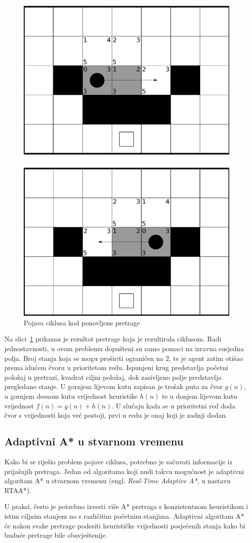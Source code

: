\documentclass[times, utf8, zavrsni, numeric]{fer}
\begin{document}
\begin{figure}[h]
	\centering
	\includegraphics[width=0.45\linewidth]{images/repeatedAStarCycle.pdf}
	\caption{Pojava ciklusa kod ponovljene pretrage}
	\label{fig:pathfindingCycle}
\end{figure} 

\par Na slici~\ref{fig:pathfindingCycle} prikazan je rezultat pretrage koja je rezultirala ciklusom. 
Radi jednostavnosti, u ovom problemu dopušteni su samo pomaci na izravno susjedna polja.
Broj stanja koja se mogu proširiti ograničen na 2, te je agent zatim otišao prema idućem čvoru u prioritetom redu. 
Ispunjeni krug predstavlja početni položaj u pretrazi, kvadrat ciljni položaj, dok zasivljeno polje predstavlja pregledano stanje. 
U gornjem lijevom kutu zapisan je trošak puta za čvor \(g(n)\), u gornjem desnom kutu vrijednost heuristike \(h(n)\) te u donjem lijevom kutu vrijednost \(f(n) = g(n) + h(n)\).
U slučaju kada se u prioritetni red doda čvor s vrijednosti koja već postoji, prvi u redu je onaj koji je zadnji dodan.

\subsection{Adaptivni A* u stvarnom vremenu}\label{ssec:rtaastar}

\par Kako bi se riješio problem pojave ciklusa, potrebno je sačuvati informacije iz prijašnjih pretraga.
Jedan od algoritama koji nudi takvu mogućnost je adaptivni algoritam A* u stvarnom vremenu (engl. \textit{Real-Time Adaptive A*}, u nastavu RTAA*).

\par U praksi, često je potrebno izvesti više A* pretraga s konzistentnom heuristikom i istim ciljnim stanjem no s različitim početnim stanjima. Adaptivni algoritam A* će nakon svake pretrage podesiti heurističke vrijednosti posjećenih stanja kako bi buduće pretrage bile obavještenije\cite{article:RTAAStar}.
\end{document}
